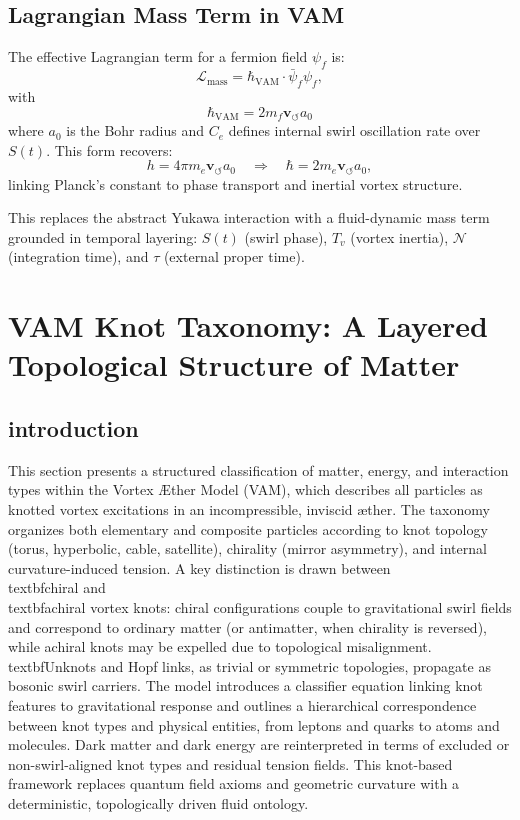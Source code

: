 \documentclass[12pt]{article}
\begin{document}
\subsection{Lagrangian Mass Term in VAM}

The effective Lagrangian term for a fermion field $\psi_f$ is:
\begin{equation}
    \mathcal{L}_\text{mass} = \hbar_{\text{VAM}} \cdot \bar{\psi}_f \psi_f,
\end{equation}
with
\begin{equation}
    \boxed{ \hbar_{\text{VAM}} = 2 m_f \mathbf{v}_{\scriptscriptstyle\boldsymbol{\circlearrowleft}} a_0 }
\end{equation}
where $a_0$ is the Bohr radius and $C_e$ defines internal swirl oscillation rate over $S(t)$. This form recovers:
\[
    h = 4\pi m_e \mathbf{v}_{\scriptscriptstyle\boldsymbol{\circlearrowleft}} a_0 \quad \Rightarrow \quad \hbar = 2 m_e \mathbf{v}_{\scriptscriptstyle\boldsymbol{\circlearrowleft}} a_0,
\]
linking Planck's constant to phase transport and inertial vortex structure.

This replaces the abstract Yukawa interaction with a fluid-dynamic mass term grounded in temporal layering: $S(t)$ (swirl phase), $T_v$ (vortex inertia), $\mathcal{N}$ (integration time), and $\tau$ (external proper time).
\section{VAM Knot Taxonomy: A Layered Topological Structure of Matter}
\label{sec:knot-taxonomy}

\subsection*{introduction}
This section presents a structured classification of matter, energy, and interaction types within the Vortex \AE{}ther Model (VAM), which describes all particles as knotted vortex excitations in an incompressible, inviscid \ae{}ther. The taxonomy organizes both elementary and composite particles according to knot topology (torus, hyperbolic, cable, satellite), chirality (mirror asymmetry), and internal curvature-induced tension. A key distinction is drawn between \\textbf{chiral} and \\textbf{achiral} vortex knots: chiral configurations couple to gravitational swirl fields and correspond to ordinary matter (or antimatter, when chirality is reversed), while achiral knots may be expelled due to topological misalignment. \\textbf{Unknots and Hopf links}, as trivial or symmetric topologies, propagate as bosonic swirl carriers. The model introduces a classifier equation linking knot features to gravitational response and outlines a hierarchical correspondence between knot types and physical entities, from leptons and quarks to atoms and molecules. Dark matter and dark energy are reinterpreted in terms of excluded or non-swirl-aligned knot types and residual tension fields. This knot-based framework replaces quantum field axioms and geometric curvature with a deterministic, topologically driven fluid ontology.
\end{document}
